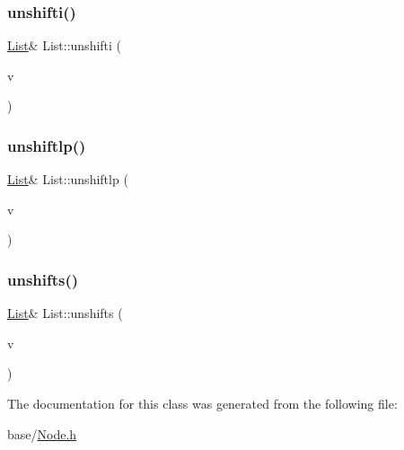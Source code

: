 \mbox{\label{classList_a0dd109d68855d0ff7a34a1b6ed4e070d}} 
\subsubsection{\texorpdfstring{unshifti()}{unshifti()}}
{\footnotesize\ttfamily \mbox{\hyperlink{classList}{List}}\& List\+::unshifti (\begin{DoxyParamCaption}\item[{\mbox{\hyperlink{Node_8h_a17693eab3c96e5b590641f884a5a6ff1}{n\+Int}}}]{v }\end{DoxyParamCaption})}

\mbox{\label{classList_a827ad090e891779171defddcdad70d26}} 
\subsubsection{\texorpdfstring{unshiftlp()}{unshiftlp()}}
{\footnotesize\ttfamily \mbox{\hyperlink{classList}{List}}\& List\+::unshiftlp (\begin{DoxyParamCaption}\item[{\mbox{\hyperlink{classList}{List}} $\ast$}]{v }\end{DoxyParamCaption})}

\mbox{\label{classList_af03bcd1c51c1f3ac400073d5dc87ad38}} 
\subsubsection{\texorpdfstring{unshifts()}{unshifts()}}
{\footnotesize\ttfamily \mbox{\hyperlink{classList}{List}}\& List\+::unshifts (\begin{DoxyParamCaption}\item[{\mbox{\hyperlink{Node_8h_a0d7591b97fcccd83c3c2ce469c8bc25c}{n\+Str}}}]{v }\end{DoxyParamCaption})}



The documentation for this class was generated from the following file\+:\begin{DoxyCompactItemize}
\item 
base/\mbox{\hyperlink{Node_8h}{Node.\+h}}\end{DoxyCompactItemize}
